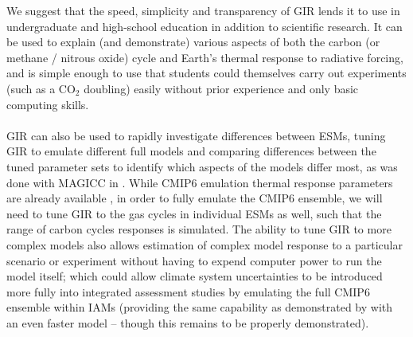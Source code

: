\documentclass[gmd, manuscript]{copernicus}
\begin{document}
We suggest that the speed, simplicity and transparency of GIR lends it to use in undergraduate and high-school education in addition to scientific research. It can be used to explain (and demonstrate) various aspects of both the carbon (or methane / nitrous oxide) cycle and Earth's thermal response to radiative forcing, and is simple enough to use that students could themselves carry out experiments (such as a CO$_2$ doubling) easily without prior experience and only basic computing skills.\\\\
GIR can also be used to rapidly investigate differences between ESMs, tuning GIR to emulate different full models and comparing differences between the tuned parameter sets to identify which aspects of the models differ most, as was done with MAGICC in \cite{Meinshausen2011}. While CMIP6 emulation thermal response parameters are already available \citep{Tsutsui2019}, in order to fully emulate the CMIP6 ensemble, we will need to tune GIR to the gas cycles in individual ESMs as well, such that the range of carbon cycles responses is simulated. The ability to tune GIR \citep{Tsutsui2017,Joos2013,Millar2016} to more complex models also allows estimation of complex model response to a particular scenario or experiment without having to expend computer power to run the model itself; which could allow climate system uncertainties to be introduced more fully into integrated assessment studies by emulating the full CMIP6 ensemble within IAMs (providing the same capability as demonstrated by \cite{Meinshausen2011} with an even faster model -- though this remains to be properly demonstrated).\\\\
\end{document}
